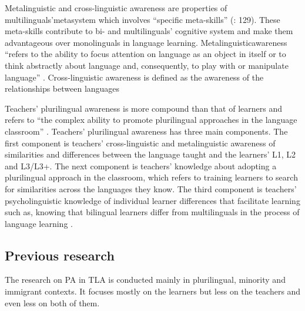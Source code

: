 \documentclass[output=paper]{../langscibook}
\begin{document}
Metalinguistic and cross-linguistic awareness are properties of multilinguals'\linebreak metasystem which involves “specific meta-skills” (\citealt{HerdinaJessner2002}: 129). These meta-skills contribute to bi- and multilinguals’ cognitive system and make them advantageous over monolinguals in language learning. Metalinguistic\linebreak awareness “refers to the ability to focus attention on language as an object in itself or to think abstractly about language and, consequently, to play with or manipulate language” \citep[42]{Jessner2006}. Cross-linguistic awareness is defined as the awareness of the relationships between languages \citep[116]{Jessner2006}

Teachers’ plurilingual awareness is more compound than that of learners and refers to “the complex ability to promote plurilingual approaches in the language classroom” \citep[103]{Otwinowska2014}. Teachers’ plurilingual awareness has three main components. The first component is teachers’ cross-linguistic and metalinguistic awareness of similarities and differences between the language taught and the learners’ L1, L2 and L3/L3+. The next component is teachers’ knowledge about adopting a plurilingual approach in the classroom, which refers to training learners to search for similarities across the languages they know. The third component is teachers’ psycholinguistic knowledge of individual learner differences that facilitate learning such as, knowing that bilingual learners differ from multilinguals in the process of language learning \citep{Otwinowska2014}.



\subsection{Previous research}



The research on PA in TLA is conducted mainly in plurilingual, minority and immigrant contexts. It focuses mostly on the learners but less on the teachers and even less on both of them.
\end{document}
